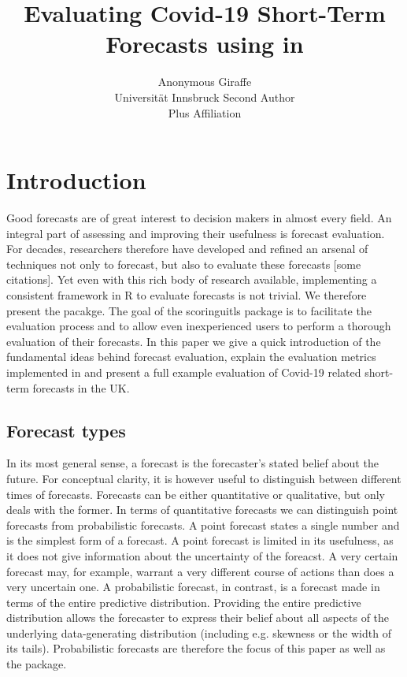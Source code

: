 \documentclass[article]{jss}
\author{Anonymous Giraffe\\Universit\"at Innsbruck \And 
        Second Author\\Plus Affiliation}
\title{Evaluating Covid-19 Short-Term Forecasts using \pkg{scoringutils} in \proglang{R}}
\begin{document}

\section[introduction]{Introduction}
Good forecasts are of great interest to decision makers in almost every field. An integral part of assessing and improving their usefulness is forecast evaluation. For decades, researchers therefore have developed and refined an arsenal of techniques not only to forecast, but also to evaluate these forecasts [some citations]. Yet even with this rich body of research available, implementing a consistent framework in R to evaluate forecasts is not trivial. We therefore present the  pacakge. The goal of the scoringuitls package is to facilitate the evaluation process and to allow even inexperienced users to perform a thorough evaluation of their forecasts. In this paper we give a quick introduction of the fundamental ideas behind forecast evaluation, explain the evaluation metrics implemented in  and present a full example evaluation of Covid-19 related short-term forecasts in the UK. 

\subsection{Forecast types}

In its most general sense, a forecast is the forecaster’s stated belief about the future. For conceptual clarity, it is however useful to distinguish between different times of forecasts. Forecasts can be either quantitative or qualitative, but  only deals with the former. In terms of quantitative forecasts we can distinguish point forecasts from probabilistic forecasts. A point forecast states a single number and is the simplest form of a forecast. A point forecast is limited in its usefulness, as it does not give information about the uncertainty of the foreacst. A very certain forecast may, for example, warrant a very different course of actions than does a very uncertain one. A probabilistic forecast, in contrast, is a forecast made in terms of the entire predictive distribution. Providing the entire predictive distribution allows the forecaster to express their belief about all aspects of the underlying data-generating distribution (including e.g. skewness or the width of its tails). Probabilistic forecasts are therefore the focus of this paper as well as the  package. 
\end{document}
